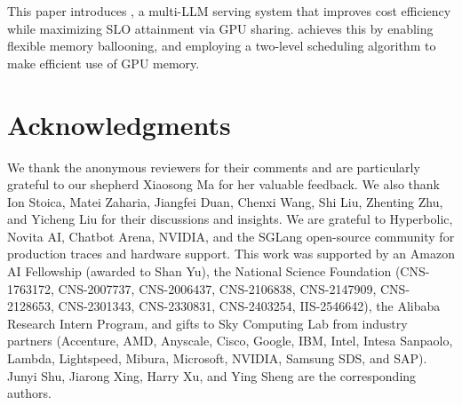 
This paper introduces \tool, a multi-LLM serving system that improves cost efficiency while maximizing SLO attainment via GPU sharing. 
\tool achieves this by enabling flexible memory ballooning, 
and employing a two-level scheduling algorithm to make efficient use of GPU memory. 

\vspace{-.5em}
\section*{Acknowledgments}
\vspace{-.5em}
We thank the anonymous reviewers for their comments and are particularly grateful to our shepherd Xiaosong Ma for her valuable feedback.
We also thank Ion Stoica, Matei Zaharia, Jiangfei Duan, Chenxi Wang, Shi Liu, Zhenting Zhu, and Yicheng Liu for their discussions and insights.
We are grateful to Hyperbolic, Novita AI, Chatbot Arena, NVIDIA, and the SGLang open-source community for production traces and hardware support.
This work was supported by an Amazon AI Fellowship (awarded to Shan Yu), the National Science Foundation (CNS-1763172, CNS-2007737, CNS-2006437, CNS-2106838, CNS-2147909, CNS-2128653, CNS-2301343, CNS-2330831, CNS-2403254, IIS-2546642), the Alibaba Research Intern Program, and gifts to Sky Computing Lab from industry partners (Accenture, AMD, Anyscale, Cisco, Google, IBM, Intel, Intesa Sanpaolo, Lambda, Lightspeed, Mibura, Microsoft, NVIDIA, Samsung SDS, and SAP). Junyi Shu, Jiarong Xing, Harry Xu, and Ying Sheng are the corresponding authors.

